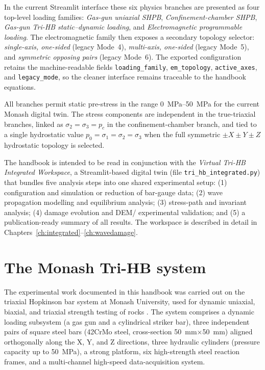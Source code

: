 \documentclass[11pt,a4paper,openany]{book}
\providecommand{\SI}[2]{\qty{#1}{#2}}
\providecommand{\SIrange}[3]{\qtyrange{#1}{#2}{#3}}
\theoremstyle{handbook}
\newcommand{\sig}{\sigma}
\begin{document}
\noindent In the current Streamlit interface these six physics branches are
presented as four top-level loading families:
\emph{Gas-gun uniaxial SHPB}, \emph{Confinement-chamber SHPB},
\emph{Gas-gun Tri-HB static--dynamic loading}, and
\emph{Electromagnetic programmable loading}.  The electromagnetic family
then exposes a secondary topology selector: \emph{single-axis, one-sided}
(legacy Mode~4), \emph{multi-axis, one-sided} (legacy Mode~5), and
\emph{symmetric opposing pairs} (legacy Mode~6).  The exported
configuration retains the machine-readable fields
\texttt{loading\_family}, \texttt{em\_topology}, \texttt{active\_axes},
and \texttt{legacy\_mode}, so the cleaner interface remains traceable to
the handbook equations.

\noindent All branches permit static pre-stress in the range
\SIrange{0}{50}{MPa} for the current Monash digital twin.  The stress
components are independent in the true-triaxial branches, linked as
$\sig_2=\sig_3=p_c$ in the confinement-chamber branch, and tied to a
single hydrostatic value $p_0=\sig_1=\sig_2=\sig_3$ when the full
symmetric $\pm X\pm Y\pm Z$ hydrostatic topology is selected.

The handbook is intended to be read in conjunction with the
\emph{Virtual Tri-HB Integrated Workspace}, a Streamlit-based digital twin
(file \texttt{tri\_hb\_integrated.py}) that bundles five analysis steps into
one shared experimental setup: (1) configuration and simulation or reduction
of bar-gauge data; (2) wave propagation modelling and equilibrium analysis;
(3) stress-path and invariant analysis; (4) damage evolution and DEM/
experimental validation; and (5) a publication-ready summary of all results.
The workspace is described in detail in
Chapters~\ref{ch:integrated}--\ref{ch:wavedamage}.

\section{The Monash Tri-HB system}\label{sec:monash-trihb}

The experimental work documented in this handbook was carried out on the
triaxial Hopkinson bar system at Monash University, used for dynamic
uniaxial, biaxial, and triaxial strength testing of rocks
\cite{Liu2019,Zhang2019Tri}. The system comprises a dynamic loading
subsystem (a gas gun and a cylindrical striker bar), three independent pairs
of square steel bars (42CrMo steel, cross-section
\SI{50}{mm}$\times$\SI{50}{mm}) aligned orthogonally along the X, Y, and Z
directions, three hydraulic cylinders (pressure capacity up to \SI{50}{MPa}),
a strong platform, six high-strength steel reaction frames, and a
multi-channel high-speed data-acquisition system.
\end{document}
